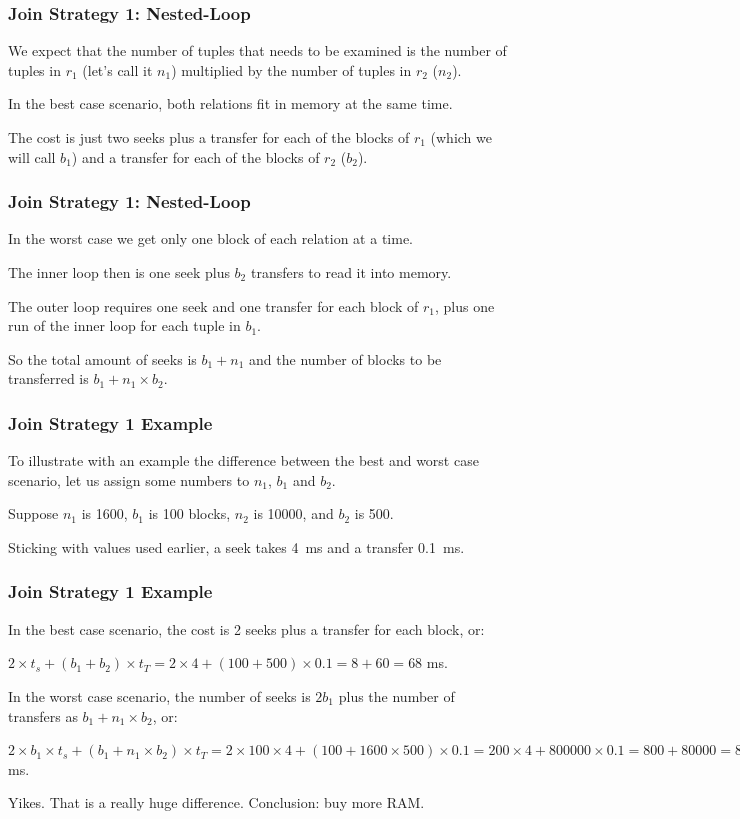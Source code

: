 \begin{frame}
\frametitle{Join Strategy 1: Nested-Loop}

We expect that the number of tuples that needs to be examined is the number of tuples in $r_{1}$ (let's call it $n_{1}$) multiplied by the number of tuples in $r_{2}$ ($n_{2}$). 

In the best case scenario, both relations fit in memory at the same time. 

The cost is just two seeks plus a transfer for each of the blocks of $r_{1}$ (which we will call $b_{1}$) and a transfer for each of the blocks of $r_{2}$ ($b_{2}$). 


\end{frame}


\begin{frame}
\frametitle{Join Strategy 1: Nested-Loop}

In the worst case we get only one block of each relation at a time. 

The inner loop then is one seek plus $b_{2}$ transfers to read it into memory.

The outer loop requires one seek and one transfer for each block of $r_{1}$, plus one run of the inner loop for each tuple in $b_{1}$. 

So the total amount of seeks is $b_{1} + n_{1}$ and the number of blocks to be transferred is $b_{1} + n_{1} \times b_{2}$.

\end{frame}

\begin{frame}
\frametitle{Join Strategy 1 Example}

To illustrate with an example the difference between the best and worst case scenario, let us assign some numbers to $n_{1}$, $b_{1}$ and $b_{2}$. 

Suppose $n_{1}$ is 1600, $b_{1}$ is 100 blocks, $n_{2}$ is 10000, and $b_{2}$ is 500. 

Sticking with values used earlier, a seek takes 4~ms and a transfer 0.1~ms. 

\end{frame}

\begin{frame}
\frametitle{Join Strategy 1 Example}

In the best case scenario, the cost is 2 seeks plus a transfer for each block, or: 

$2 \times t_{s} + (b_{1} + b_{2}) \times t_{T} = 2 \times 4 + (100 + 500) \times 0.1 = 8 + 60 = 68$ ms. 

In the worst case scenario, the number of seeks is $2b_{1}$ plus the number of transfers as $b_{1} + n_{1} \times b_{2}$, or: 

$2 \times b_{1} \times t_{s} + (b_{1} + n_{1} \times b_{2}) \times t_{T} = 2 \times 100 \times 4 + (100 + 1600 \times 500) \times 0.1 = 200 \times 4 + 800000 \times 0.1 = 800 + 80000 = 80800$ ms. 

Yikes. That is a really huge difference. Conclusion: buy more RAM.

\end{frame}

